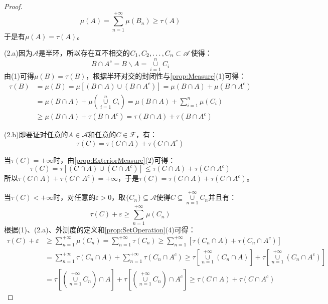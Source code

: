 \begin{proof}
\begin{equation*}
		\mu(A)=\sum_{n=1}^{+\infty}\mu(B_n)\geqslant\tau(A)
	\end{equation*}
	于是有$\mu(A)=\tau(A)$。\par
	(2.a)因为$\mathscr{A}$是半环，所以存在互不相交的$C_1, C_2, \dots, C_{n}\subset\mathscr{A}$使得：
	\begin{equation*}
		B\cap A^c=B\backslash A=\underset{i=1}{\overset{n}{\cup}}C_i
	\end{equation*}
	由(1)可得$\mu(B)=\tau(B)$，根据半环对交的封闭性与\cref{prop:Measure}(1)可得：
	\begin{align*}
		\tau(B)&=\mu(B)=\mu[(B\cap A)\cup (B\cap A^c)]=\mu(B\cap A)+\mu(B\cap A^c) \\
		&=\mu(B\cap A)+\mu\left(\underset{i=1}{\overset{n}{\cup}}C_i\right)=\mu(B\cap A)+\sum_{i=1}^{n}\mu(C_i) \\
		&\geqslant\mu(B\cap A)+\tau(B\cap A^c)=\tau(B\cap A)+\tau(B\cap A^c)
	\end{align*}\par
	(2.b)即要证对任意的$A\in \mathscr{A}$和任意的$C\in \mathscr{F}$，有：
	\begin{equation*}
		\tau(C)=\tau(C\cap A)+\tau(C\cap A^c)
	\end{equation*}\par
	当$\tau(C)=+\infty$时，由\cref{prop:ExteriorMeasure}(2)可得：
	\begin{equation*}
		\tau(C)=\tau[(C\cap A)\cup(C\cap A^c)]\leqslant\tau(C\cap A)+\tau(C\cap A^c)
	\end{equation*}
	所以$\tau(C\cap A)+\tau(C\cap A^c)=+\infty$，于是$\tau(C)=\tau(C\cap A)+\tau(C\cap A^c)$。\par
	当$\tau(C)<+\infty$时，对任意的$\varepsilon>0$，取$\{C_n\}\subseteq\mathscr{A}$使得$C\subseteq\underset{n=1}{\overset{+\infty}{\cup}}C_n$并且有：
	\begin{equation*}
		\tau(C)+\varepsilon\geqslant\sum_{n=1}^{+\infty}\mu(C_n)
	\end{equation*}
	根据(1)、(2.a)、外测度的定义和\cref{prop:SetOperation}(4)可得：
	\begin{align*}
		\tau(C)+\varepsilon&\geqslant\sum_{n=1}^{+\infty}\mu(C_n)=\sum_{n=1}^{+\infty}\tau(C_n)\geqslant\sum_{n=1}^{+\infty}[\tau(C_n\cap A)+\tau(C_n\cap A^c)] \\
		&=\sum_{n=1}^{+\infty}\tau(C_n\cap A)+\sum_{n=1}^{+\infty}\tau(C_n\cap A^c)\geqslant\tau\left[\underset{n=1}{\overset{+\infty}{\cup}}(C_n\cap A)\right]+\tau\left[\underset{n=1}{\overset{+\infty}{\cup}}(C_n\cap A^c)\right] \\
		&=\tau\left[\left(\underset{n=1}{\overset{+\infty}{\cup}}C_n\right)\cap A\right]+\tau\left[\left(\underset{n=1}{\overset{+\infty}{\cup}}C_n\right)\cap A^c\right]\geqslant\tau(C\cap A)+\tau(C\cap A^c)

\end{align*}
\end{proof}
